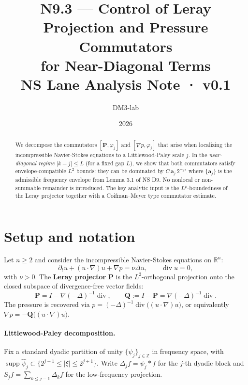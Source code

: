 \documentclass[11pt]{article}
\title{\textbf{N9.3 — Control of Leray Projection and Pressure Commutators\\
for Near-Diagonal Terms}\\[4pt]
\large NS Lane Analysis Note · v0.1}
\author{DM3-lab}
\date{2026}
\theoremstyle{definition}
\newcommand{\PP}{\mathbf{P}}          %
\newcommand{\QQ}{\mathbf{Q}}          %
\newcommand{\Dj}{\Delta_j}            %
\newcommand{\Lp}[1]{L^{#1}}
\newcommand{\abs}[1]{\lvert #1 \rvert}
\newcommand{\R}{\mathbb{R}}
\newcommand{\Z}{\mathbb{Z}}
\newcommand{\divv}{\operatorname{div}}
\newcommand{\supp}{\operatorname{supp}}
\newcommand{\env}{\mathbf{a}}         %
\begin{document}
\maketitle

\begin{abstract}
We decompose the commutators $[\PP, \varphi_j]$ and $[\nabla p, \varphi_j]$
that arise when localizing the incompressible Navier-Stokes equations to a
Littlewood-Paley scale $j$.  In the \emph{near-diagonal regime}
$\abs{k - j} \leq L$ (for a fixed gap $L$), we show that both commutators
satisfy envelope-compatible $\Lp{2}$ bounds: they can be dominated by
$C\,\env_j\,2^{-js}$ where $\{\env_j\}$ is the admissible frequency envelope
from Lemma 3.1 of NS D9.  No nonlocal or non-summable remainder is
introduced.  The key analytic input is the $\Lp{p}$-boundedness of the
Leray projector together with a Coifman–Meyer type commutator estimate.
\end{abstract}

\tableofcontents

\section{Setup and notation}

Let $n \geq 2$ and consider the incompressible Navier-Stokes equations on
$\R^n$:
\begin{equation}\label{NS}
  \partial_t u + (u \cdot \nabla) u + \nabla p = \nu \Delta u, \qquad
  \divv u = 0,
\end{equation}
with $\nu > 0$.  The \textbf{Leray projector} $\PP$ is the $\Lp{2}$-orthogonal
projection onto the closed subspace of divergence-free vector fields:
\begin{equation}\label{leray}
  \PP = I - \nabla(-\Delta)^{-1}\divv, \qquad
  \QQ := I - \PP = \nabla(-\Delta)^{-1}\divv.
\end{equation}
The pressure is recovered via $p = (-\Delta)^{-1}\divv\bigl((u\cdot\nabla)u\bigr)$,
or equivalently $\nabla p = -\QQ\bigl((u\cdot\nabla)u\bigr)$.

\paragraph{Littlewood-Paley decomposition.}
Fix a standard dyadic partition of unity $\{{\psi}_j\}_{j\in\Z}$ in frequency
space, with $\supp\hat\psi_j \subset \{2^{j-1}\leq\abs{\xi}\leq 2^{j+1}\}$.
Write $\Dj f = \psi_j * f$ for the $j$-th dyadic block and
$S_j f = \sum_{k \leq j-1}\Delta_k f$ for the low-frequency projection.
\end{document}
